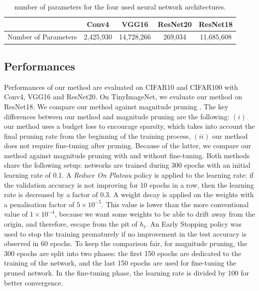 \begin{table}[ht]
  \centering
  \begin{tabular}{lcccc}
    \cline{2-5}
                         & \textbf{Conv4} & \textbf{VGG16} & \textbf{ResNet20} & \textbf{ResNet18} \\ \hline
    Number of Parameters & 2,425,930      & 14,728,266     & 269,034           & 11,685,608        \\ \hline
  \end{tabular}
  \caption{ number of parameters for the four used neural network architectures.}
  \label{tab:chap1:networks_size}
\end{table}


\subsection{Performances}
\label{sec:chap1:performances}
Performances of our method are evaluated on CIFAR10 and CIFAR100 with Conv4,
VGG16 and ResNet20. On TinyImageNet, we evaluate our method on ResNet18. We
compare our method against magnitude pruning \cite{DBLP:conf/nips/HanPTD15}. The
key differences between our method and magnitude pruning are the following:
$(i)$ our method uses a budget loss to encourage sparsity, which takes into
account the final pruning rate from the beginning of the training process,
$(ii)$ our method does not require fine-tuning after pruning. Because of the
latter, we compare our method against magnitude pruning with and without
fine-tuning. Both methods share the following setup: networks are trained during
300 epochs with an initial learning rate of 0.1. A {\em Reduce On Plateau}
policy is applied to the learning rate: if the validation accuracy is not
improving for 10 epochs in a row, then the learning rate is decreased by a
factor of 0.3. A weight decay is applied on the weights with a penalisation
factor of $5\times10^{−5}$. This value is lower than the more conventional value
of $1\times10^{-4}$, because we want some weights to be able to drift away from the
origin, and therefore, escape from the pit of $h_t$. An Early Stopping policy was
used to stop the training prematurely if no improvement in the test accuracy is
observed in 60 epochs. To keep the comparison fair, for magnitude pruning, the
300 epochs are split into two phases: the first 150 epochs are dedicated to the
training of the network, and the last 150 epochs are used for fine-tuning the
pruned network. In the fine-tuning phase, the learning rate is divided by 100
for better convergence. \\

